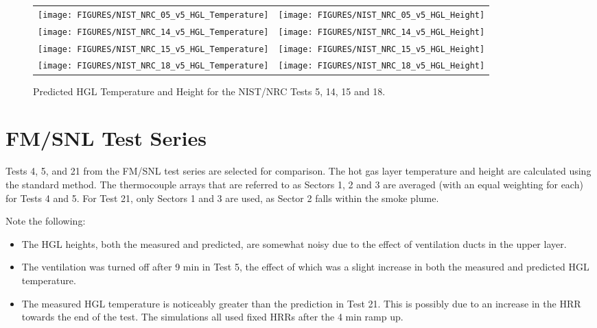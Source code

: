 \begin{figure}[p]
\begin{tabular*}{\textwidth}{l@{\extracolsep{\fill}}r}
\texttt{[image: FIGURES/NIST\_NRC\_05\_v5\_HGL\_Temperature]} &
\texttt{[image: FIGURES/NIST\_NRC\_05\_v5\_HGL\_Height]} \\
\texttt{[image: FIGURES/NIST\_NRC\_14\_v5\_HGL\_Temperature]} &
\texttt{[image: FIGURES/NIST\_NRC\_14\_v5\_HGL\_Height]} \\
\texttt{[image: FIGURES/NIST\_NRC\_15\_v5\_HGL\_Temperature]} &
\texttt{[image: FIGURES/NIST\_NRC\_15\_v5\_HGL\_Height]} \\
\texttt{[image: FIGURES/NIST\_NRC\_18\_v5\_HGL\_Temperature]} &
\texttt{[image: FIGURES/NIST\_NRC\_18\_v5\_HGL\_Height]}
\end{tabular*}
\caption{Predicted HGL Temperature and Height for the NIST/NRC Tests 5, 14, 15 and 18.} \label{NIST_NRC_HGL_Open_2}
\end{figure}


\clearpage

\section{FM/SNL Test Series}

Tests 4, 5, and 21 from the FM/SNL test series are selected for comparison. The hot gas layer temperature and height are calculated using the
standard method. The thermocouple arrays that are referred to as Sectors 1, 2 and 3 are averaged (with an equal weighting for each) for Tests 4 and
5. For Test 21, only Sectors 1 and 3 are used, as Sector 2 falls within the smoke plume.

Note the following:
\begin{itemize}
\item The HGL heights, both the measured and predicted, are somewhat noisy due to the effect of ventilation ducts in the upper layer.
\item The ventilation was turned off after 9 min in Test 5,
the effect of which was a slight increase in both the measured and predicted HGL temperature.
\item The measured HGL temperature is noticeably greater than the prediction in Test 21.
This is possibly due to an increase in the HRR towards the end of the test.  The simulations all used fixed HRRs after the 4 min ramp up.
\end{itemize}

